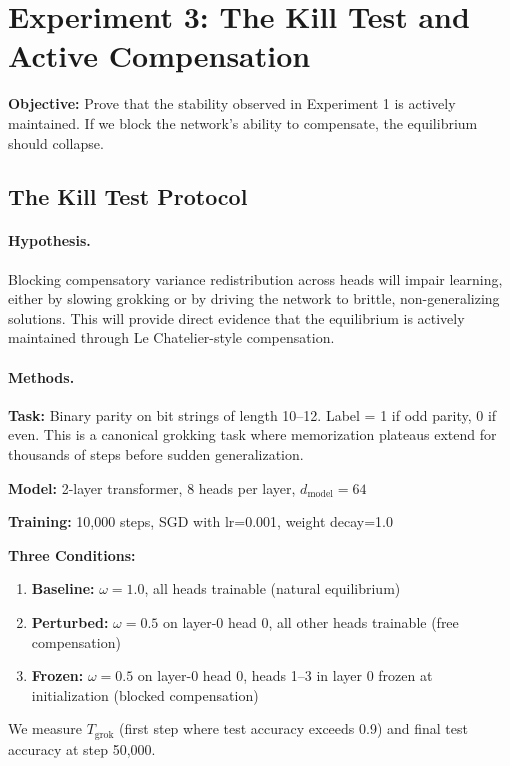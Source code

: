 \section{Experiment 3: The Kill Test and Active Compensation}\label{sec:exp3}

\textbf{Objective:} Prove that the stability observed in Experiment 1 is actively maintained. If we block the network's ability to compensate, the equilibrium should collapse.

\subsection{The Kill Test Protocol}

\paragraph{Hypothesis.}
Blocking compensatory variance redistribution across heads will impair learning, either by slowing grokking or by driving the network to brittle, non-generalizing solutions. This will provide direct evidence that the equilibrium is actively maintained through Le Chatelier-style compensation.

\paragraph{Methods.}
\textbf{Task:} Binary parity on bit strings of length 10--12. Label = 1 if odd parity, 0 if even. This is a canonical grokking task where memorization plateaus extend for thousands of steps before sudden generalization.

\textbf{Model:} 2-layer transformer, 8 heads per layer, $d_{\text{model}}=64$

\textbf{Training:} 10,000 steps, SGD with lr=0.001, weight decay=1.0

\textbf{Three Conditions:}
\begin{enumerate}
\item \textbf{Baseline:} $\omega = 1.0$, all heads trainable (natural equilibrium)
\item \textbf{Perturbed:} $\omega = 0.5$ on layer-0 head 0, all other heads trainable (free compensation)
\item \textbf{Frozen:} $\omega = 0.5$ on layer-0 head 0, heads 1--3 in layer 0 frozen at initialization (blocked compensation)
\end{enumerate}

We measure $T_{\text{grok}}$ (first step where test accuracy exceeds 0.9) and final test accuracy at step 50,000.

